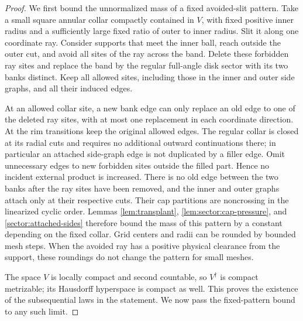 \begin{proof}
We first bound the unnormalized mass of a fixed avoided-slit pattern.
Take a small square annular collar compactly contained in $V$, with
fixed positive inner radius and a sufficiently large fixed ratio of
outer to inner radius.  Slit it along one coordinate ray.  Consider
supports that meet the inner ball, reach outside the outer cut, and
avoid all sites of the ray across the band.  Delete these forbidden
ray sites and replace the band by the regular full-angle disk sector
with its two banks distinct.  Keep all allowed sites, including those
in the inner and outer side graphs, and all their induced edges.

At an allowed collar site, a new bank edge can only replace an old
edge to one of the deleted ray sites, with at most one replacement
in each coordinate direction.  At the rim transitions keep the
original allowed edges.  The regular collar is closed at its radial
cuts and requires no additional outward continuations there; in
particular an attached side-graph edge is not duplicated by a filler
edge.  Omit unnecessary edges to new forbidden sites outside the
filled part.  Hence no incident external product is increased.
There is no old edge between the two banks
after the ray sites have been removed, and the inner and outer
graphs attach only at their respective cuts.  Their cap partitions
are noncrossing in the linearized cyclic order.  Lemmas
\ref{lem:transplant}, \ref{lem:sector:cap-pressure}, and
\ref{sector:attached-sides} therefore bound the mass of this pattern
by a constant depending on the fixed collar.  Grid centers and radii
can be rounded by bounded mesh steps.  When the avoided ray has a
positive physical clearance from the support, these roundings do not
change the pattern for small meshes.

The space $V$ is locally compact and second countable, so $V^\dagger$
is compact metrizable; its Hausdorff hyperspace is compact as well.
This proves the existence of the subsequential laws in the statement.
We now pass the fixed-pattern bound to any such limit.


\end{proof}
